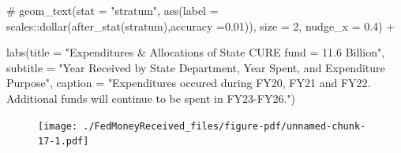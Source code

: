 \documentclass[
  letterpaper,
  DIV=11,
  numbers=noendperiod]{scrreport}
\newenvironment{Shaded}{\begin{snugshade}}{\end{snugshade}}
\newcommand{\AttributeTok}[1]{\textcolor[rgb]{0.40,0.45,0.13}{#1}}
\newcommand{\CommentTok}[1]{\textcolor[rgb]{0.37,0.37,0.37}{#1}}
\newcommand{\FunctionTok}[1]{\textcolor[rgb]{0.28,0.35,0.67}{#1}}
\newcommand{\NormalTok}[1]{\textcolor[rgb]{0.00,0.23,0.31}{#1}}
\newcommand{\StringTok}[1]{\textcolor[rgb]{0.13,0.47,0.30}{#1}}
\begin{document}
\begin{Shaded}
\begin{Highlighting}[]
 \CommentTok{\# geom\_text(stat = "stratum", aes(label = scales::dollar(after\_stat(stratum),accuracy =0.01)), size = 2, nudge\_x = 0.4) +}

  \FunctionTok{labs}\NormalTok{(}\AttributeTok{title =} \StringTok{"Expenditures \& Allocations of State CURE fund = 11.6 Billion"}\NormalTok{, }
  \AttributeTok{subtitle =} \StringTok{"Year Received by State Department, Year Spent, and Expenditure Purpose"}\NormalTok{, }
  \AttributeTok{caption =} \StringTok{"Expenditures occured during FY20, FY21 and FY22. }
\StringTok{       Additional funds will continue to be spent in FY23{-}FY26."}\NormalTok{)}
\end{Highlighting}
\end{Shaded}

\begin{figure}[H]

{\centering \texttt{[image: ./FedMoneyReceived\_files/figure-pdf/unnamed-chunk-17-1.pdf]}

}

\end{figure}
\end{document}
